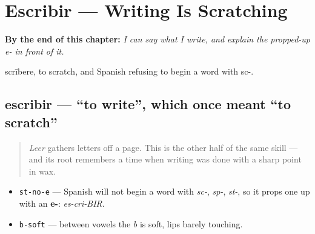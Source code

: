 
\chapter{Escribir — Writing Is Scratching}
\label{ch:spanish-escribir}

\begin{chapteropening}
\textbf{By the end of this chapter:} \emph{I can say what I write, and explain the propped-up e- in front of it.}

scrībere, to scratch, and Spanish refusing to begin a word with sc-.
\end{chapteropening}

\section[escribir]{escribir — \textquotedblleft{}to write\textquotedblright{}, which once meant \textquotedblleft{}to scratch\textquotedblright{}}

\label{lesson:ES-C34-escribir}



\begin{quote}
\emph{Leer} gathers letters off a page. This is the other half of the same skill — and its root remembers a time when writing was done with a sharp point in wax.
\end{quote}

\begin{sounds}
\begin{itemize}
\raggedright
  \item \texttt{st-no-e} — Spanish will not begin a word with \emph{sc-}, \emph{sp-}, \emph{st-}, so it props one up with an \textbf{e-}: \emph{es-cri-BIR}.
  \item \texttt{b-soft} — between vowels the \emph{b} is soft, lips barely touching.
\end{itemize}
\end{sounds}

